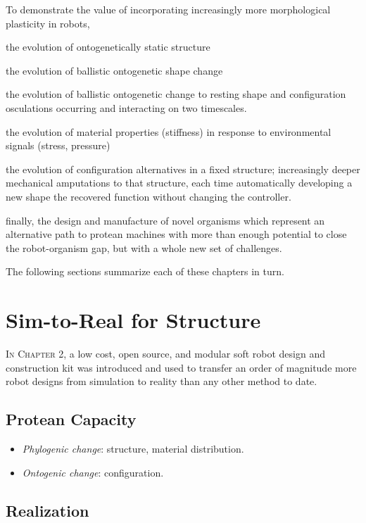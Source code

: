 To demonstrate 
the value of incorporating increasingly more morphological plasticity in robots,


the evolution of ontogenetically static structure

the evolution of ballistic ontogenetic shape change

the evolution of ballistic ontogenetic change to resting shape and configuration osculations occurring and interacting on two timescales.

the evolution of material properties (stiffness) in response to environmental signals (stress, pressure)


the evolution of configuration alternatives in a fixed structure; increasingly deeper mechanical amputations to that structure, each time automatically developing a new shape the recovered function without changing the controller.

finally, the design and manufacture of novel organisms which represent an alternative path to protean machines with more than enough potential to close the robot-organism gap, but with a whole new set of challenges.



The following sections summarize each of these 
chapters in turn.


\section{Sim-to-Real for Structure}

\textsc{In Chapter 2,}
a low cost, open source, and modular soft robot design and construction kit was introduced and used to
transfer an order of magnitude more robot designs from simulation to reality than any other method to date.

\subsection{Protean Capacity}

\begin{itemize}
    \item \textit{Phylogenic change}: structure, material distribution.
    \item \textit{Ontogenic change}: configuration.
\end{itemize}

\subsection{Realization}

